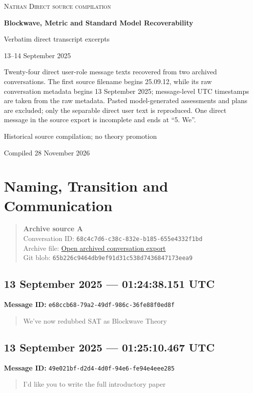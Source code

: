\documentclass[11pt,letterpaper]{article}
\newcommand{\messageentry}[3]{%
  \Needspace{7\baselineskip}
  \subsection*{#1}
  {\small\textbf{Message ID:} \texttt{#2}}
  \vspace{2pt}
}
\newcommand{\sourceblock}[4]{%
  \begin{quote}\small
  \textbf{#1}\\
  Conversation ID: \texttt{#2}\\
  Archive file: \href{#3}{Open archived conversation export}\\
  Git blob: \texttt{#4}
  \end{quote}
}
\begin{document}
\begin{titlepage}
\centering
\vspace*{1.15in}
{\Large\textsc{Nathan Direct source compilation}\par}
\vspace{0.45in}
{\huge\bfseries Blockwave, Metric and Standard Model Recoverability\par}
\vspace{0.22in}
{\large Verbatim direct transcript excerpts\par}
\vspace{0.7in}
{\large 13--14 September 2025\par}
\vfill
\begin{minipage}{0.84\textwidth}
\small
Twenty-four direct user-role message texts recovered from two archived conversations. The first source filename begins 25.09.12, while its raw conversation metadata begins 13 September 2025; message-level UTC timestamps are taken from the raw metadata. Pasted model-generated assessments and plans are excluded; only the separable direct user text is reproduced. One direct message in the source export is incomplete and ends at ``5. We''.
\end{minipage}
\vfill
{\small Historical source compilation; no theory promotion\par}
{\small Compiled 28 November 2026\par}
\end{titlepage}
\section*{Naming, Transition and Communication}
\sourceblock{Archive source A}{68c4c7d6-c38c-832e-b185-655e4332f1bd}{https://github.com/Satobloc/HsH/blob/main/DEVELOPMENT_FULL_CONVOS/MOSTLY_EARLY_NLM/25.09.12\%E2\%80\%A225.09.12\%E2\%80\%A2Blockwave\%20Theory\%20Redubbed\%20\%E2\%80\%94\%20raw.json}{65b226c9\hspace{0pt}464db9ef\hspace{0pt}91d31c53\hspace{0pt}8d743684\hspace{0pt}7173eea9}
\messageentry{13 September 2025 --- 01:24:38.151 UTC}{e68ccb68-79a2-49df-986c-36fe88f0ed8f}{}
\begin{quote}\small
We’ve now redubbed SAT as Blockwave Theory
\end{quote}

\messageentry{13 September 2025 --- 01:25:10.467 UTC}{49e021bf-d2d4-4d0f-94e6-fe94e4eee285}{}
\begin{quote}\small
I’d like you to write the full introductory paper
\end{quote}
\end{document}
